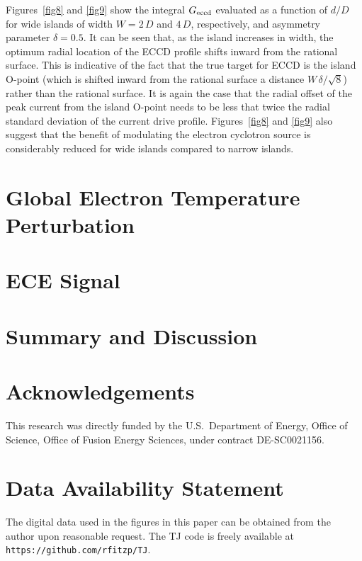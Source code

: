 \documentclass[12pt,prb,aps]{revtex4-1}
\begin{document}
Figures~\ref{fig8} and \ref{fig9} show the integral $G_{\rm eccd}$ evaluated  as a function of $d/D$ for wide islands of width $W=2\,D$ and $4\,D$, respectively, and asymmetry parameter
$\delta=0.5$. It can be seen that, as the island increases in width, the optimum radial location of the ECCD profile shifts inward from the rational
surface.\cite{ece6} This is indicative of the fact that the true target for ECCD is the island O-point (which is shifted inward from the
rational surface a distance $W\,\delta/\sqrt{8}$) rather than the rational surface. It is again the case that the radial offset of the peak current from the island
O-point needs to be less that twice the radial standard deviation of the current drive profile. 
Figures~\ref{fig8} and \ref{fig9}  also suggest that the benefit of modulating the
electron cyclotron source is considerably reduced for wide islands compared to narrow islands. 

\section{Global Electron Temperature Perturbation}\label{s5}

\section{ECE Signal}\label{s6}

\section{Summary and Discussion}\label{s7}

\section*{Acknowledgements}
This research was directly funded by the U.S.\ Department of Energy, Office of Science, Office of Fusion Energy Sciences, under  contract DE-SC0021156. 

\section*{Data Availability Statement}
The digital data used in the figures in this paper can be obtained from the author upon reasonable request. The TJ code is freely 
available at {\tt https://github.com/rfitzp/TJ}. 
\end{document}

